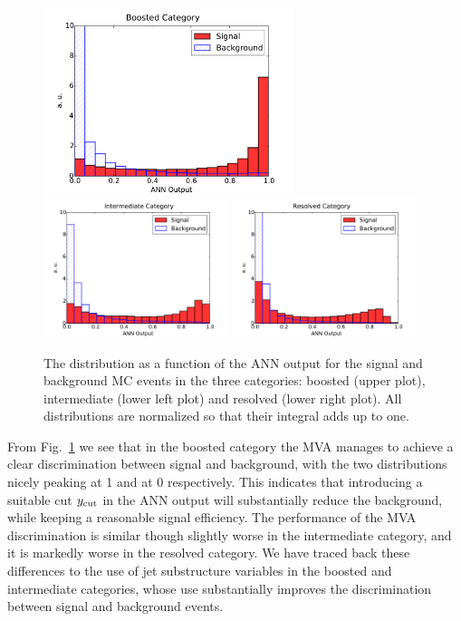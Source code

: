 \begin{figure}[t]
\begin{center}
\includegraphics[width=0.65\textwidth]{plots/Boosted_disc_noPU.pdf}
\includegraphics[width=0.48\textwidth]{plots/Intermediate_disc_noPU.pdf}
\includegraphics[width=0.48\textwidth]{plots/Resolved_disc_noPU.pdf}
\caption{\small The distribution as a function of the ANN output
  for the signal and background MC events in the three categories:
  boosted (upper plot), intermediate (lower left plot) and
  resolved (lower right plot).
  All distributions are normalized so that their integral
  adds up to one.
}
\label{fig:nnresponse}
\end{center}
\end{figure}

From Fig.~\ref{fig:nnresponse} we see that in the boosted category the MVA manages
to achieve a clear discrimination between signal and background, with the two distributions
nicely peaking at 1 and at 0 respectively.
%
This indicates that introducing a suitable cut
$y_{\rm cut}$
in the ANN output will substantially reduce the background,
while keeping a reasonable signal efficiency.
%
The performance of the MVA discrimination is similar though slightly worse in the intermediate
category, and it is markedly worse in the resolved category.
%
We have traced back these differences to the use of jet substructure variables
in the boosted and intermediate categories, whose use substantially
improves the
discrimination between signal and background events.



